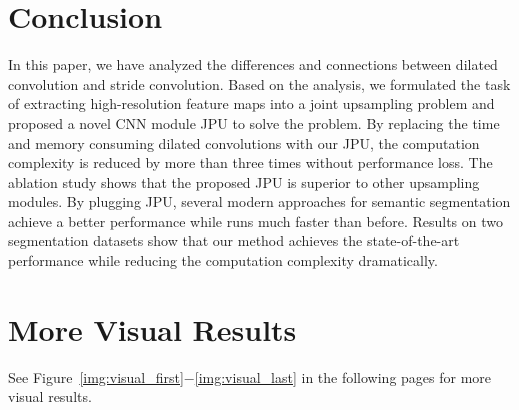 \documentclass[10pt,twocolumn,letterpaper]{article}
\begin{document}
\section{Conclusion}
In this paper, we have analyzed the differences and connections between dilated convolution and stride convolution.
Based on the analysis, we formulated the task of extracting high-resolution feature maps into a joint upsampling problem and proposed a novel CNN module JPU to solve the problem.
By replacing the time and memory consuming dilated convolutions with our JPU, the computation complexity is reduced by more than three times without performance loss.
The ablation study shows that the proposed JPU is superior to other upsampling modules.
By plugging JPU, several modern approaches for semantic segmentation achieve a better performance while runs much faster than before.
Results on two segmentation datasets show that our method achieves the state-of-the-art performance while reducing the computation complexity dramatically. 


{\small


}

\section*{More Visual Results}
See Figure~\ref{img:visual_first}$-$\ref{img:visual_last} in the following pages for more visual results.
\end{document}
